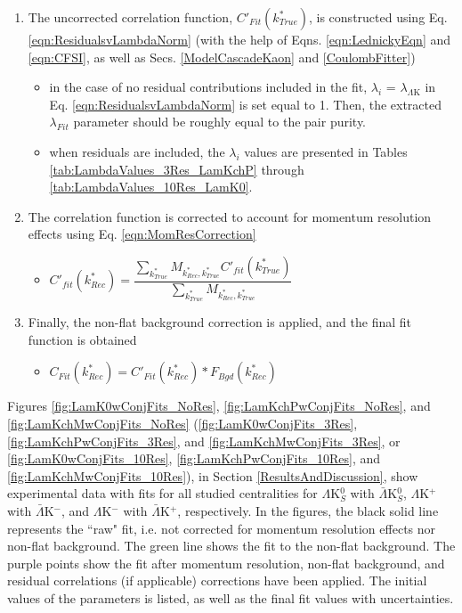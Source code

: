 \documentclass[../AnalysisNoteJBuxton.tex]{subfiles}
\begin{document}
\begin{enumerate}
 \item The uncorrected correlation function, $C'_{Fit}(k^{*}_{True})$, is constructed using Eq. \ref{eqn:ResidualsvLambdaNorm} (with the help of Eqns. \ref{eqn:LednickyEqn} and \ref{eqn:CFSI}, as well as Secs. \ref{ModelCascadeKaon} and \ref{CoulombFitter})
 \begin{itemize}
 \item in the case of no residual contributions included in the fit, $\lambda_{i}$ = $\lambda_{\Lambda\mathrm{K}}$ in Eq. \ref{eqn:ResidualsvLambdaNorm} is set equal to 1.  Then, the extracted $\lambda_{Fit}$ parameter should be roughly equal to the pair purity.
 \item when residuals are included, the $\lambda_{i}$ values are presented in Tables \ref{tab:LambdaValues_3Res_LamKchP} through \ref{tab:LambdaValues_10Res_LamK0}.
 \end{itemize}
 \item The correlation function is corrected to account for momentum resolution effects using Eq. \ref{eqn:MomResCorrection}
 \begin{itemize}
  \item $C'_{fit}(k^{*}_{Rec}) = \dfrac{\sum\limits_{k^{*}_{True}}M_{k^{*}_{Rec},k^{*}_{True}}C'_{fit}(k^{*}_{True})}{\sum\limits_{k^{*}_{True}}M_{k^{*}_{Rec},k^{*}_{True}}}$
 \end{itemize}
 \item Finally, the non-flat background correction is applied, and the final fit function is obtained
 \begin{itemize}
  \item $C_{Fit}(k^{*}_{Rec}) = C'_{Fit}(k^{*}_{Rec})*F_{Bgd}(k^{*}_{Rec})$
 \end{itemize}
\end{enumerate}

Figures \ref{fig:LamK0wConjFits_NoRes}, \ref{fig:LamKchPwConjFits_NoRes}, and \ref{fig:LamKchMwConjFits_NoRes} (\ref{fig:LamK0wConjFits_3Res}, \ref{fig:LamKchPwConjFits_3Res}, and \ref{fig:LamKchMwConjFits_3Res}, or \ref{fig:LamK0wConjFits_10Res}, \ref{fig:LamKchPwConjFits_10Res}, and \ref{fig:LamKchMwConjFits_10Res}), in Section \ref{ResultsAndDiscussion}, show experimental data with fits for all studied centralities for $\Lambda$K$^{0}_{S}$ with $\bar{\Lambda}$K$^{0}_{S}$, $\Lambda$K$^{+}$ with $\bar{\Lambda}$K$^{-}$, and $\Lambda$K$^{-}$ with $\bar{\Lambda}$K$^{+}$, respectively.  In the figures, the black solid line represents the ``raw" fit, i.e. not corrected for momentum resolution effects nor non-flat background.  The green line shows the fit to the non-flat background.  The purple points show the fit after momentum resolution, non-flat background, and residual correlations (if applicable) corrections have been applied.  The initial values of the parameters is listed, as well as the final fit values with uncertainties.
\end{document}
